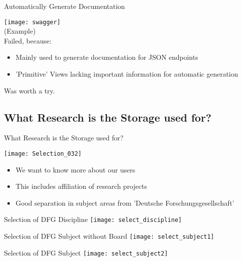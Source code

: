 \begin{frame}[c]{Automatically Generate Documentation}
    \begin{multicols}{2}
        \large
        \texttt{[image: swagger]} \\
        (Example) \\
        Failed, because:
        \begin{itemize}[<+(1)->]
            \item Mainly used to generate documentation for JSON endpoints
            \item 'Primitive' Views lacking important information for automatic generation
        \end{itemize}
        Was worth a try.
    \end{multicols}
\end{frame}

\subsection{What Research is the Storage used for?}

\begin{frame}[c]{What Research is the Storage used for?}
    \begin{multicols}{2}
    \texttt{[image: Selection\_032]}
    \large
        \begin{itemize}[<+(1)->]
            \item We want to know more about our users
            \item This includes affiliation of research projects
            \item Good separation in subject areas from 'Deutsche Forschungsgesellschaft'
        \end{itemize}
    \end{multicols}
\end{frame}


\begin{frame}[c]{Selection of DFG Discipline}
    \texttt{[image: select\_discipline]}
\end{frame}
\begin{frame}[c]{Selection of DFG Subject without Board}
    \texttt{[image: select\_subject1]}
\end{frame}
\begin{frame}[c]{Selection of DFG Subject}
    \texttt{[image: select\_subject2]}
\end{frame}


